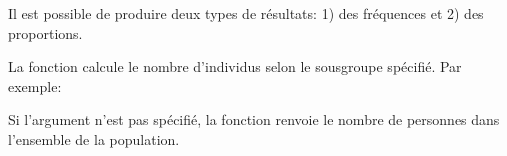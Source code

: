 \documentclass[letterpaper,10pt,french]{sphinxmanual}
\begin{document}
Il est possible de produire deux types de résultats: 1) des fréquences et 2) des proportions.


La fonction  calcule le nombre d’individus selon le sous\sphinxhyphen{}groupe spécifié. Par exemple:

\begin{sphinxVerbatim}[commandchars=\\\{\}]
\end{sphinxVerbatim}

Si l’argument  n’est pas spécifié, la fonction renvoie le nombre de personnes dans l’ensemble de la population.

\end{document}

